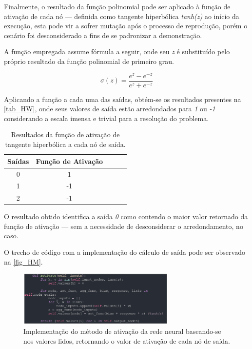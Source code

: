 Finalmente, o resultado da função polinomial pode ser aplicado à função de ativação de cada nó — definida como
tangente hiperbólica \textit{tanh(z)} ao início da execução, esta pode vir a sofrer mutação após o processo de reprodução,
porém o cenário foi desconsiderado a fins de se padronizar a demonstração.

A função empregada assume fórmula a seguir, onde seu \textit{z} é substituído pelo próprio resultado da função polinomial de primeiro grau.

\[ \sigma(z) = \frac{e^z - e^{-z}}{e^z + e^{-z}}\]

Aplicando a função a cada uma das saídas, obtém-se os resultados presentes na \autoref{tab_HW}, onde
seus valores de saída estão arredondados para \textit{1} ou \textit{-1} considerando a escala imensa e trivial para a resolução do problema.

\begin{table}[htb]
	\centering
    \caption{\label{tab_HW}Resultados da função de ativação de tangente hiperbólica a cada nó de saída.}
    \begin{tabular}{ccccc}
        \hline
		\textbf{Sa\'{i}das} & \textbf{Fun\c{c}\~{a}o de Ativa\c{c}\~{a}o} \\ \hline
		0 & 1    \\ \hline
		1 & -1    \\ \hline
		2 & -1  \\ \hline
    \end{tabular}
    
\end{table}

O resultado obtido identifica a saída \textit{0} como contendo o maior valor retornado da função de ativação —
sem a necessidade de desconsiderar o arredondamento, no caso.

O trecho de código com a implementação do cálculo de saída pode ser observado na \autoref{fig_HM}.

\begin{figure}[htb]
        \centering
        \caption{\label{fig_HM}Implementação do método de ativação da rede neural baseando-se nos valores lidos, retornando o valor de ativação de cada nó de saída.}
        \includegraphics[width=0.7\textwidth]{images/HM.png}
\end{figure}

